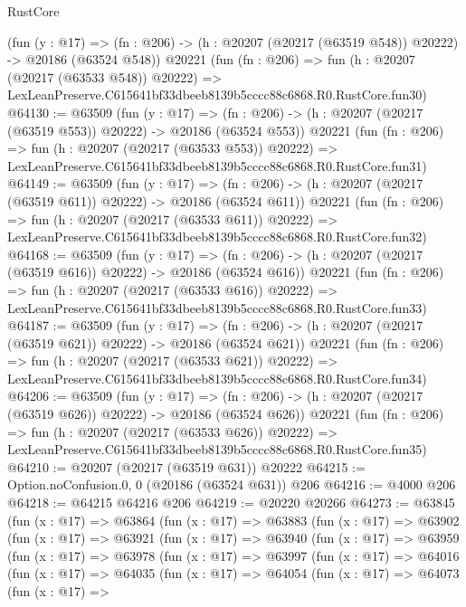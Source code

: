 \begin{lexlean}{RustCore}
\begin{coremodule}
    (fun (y : @17) =>
    (fn : @206) -> (h : @20207 (@20217 (@63519 @548)) @20222) -> @20186 (@63524 @548))
    @20221
    (fun (fn : @206) =>
    fun (h : @20207 (@20217 (@63533 @548)) @20222) =>
    LexLeanPreserve.C615641bf33dbeeb8139b5cccc88c6868.R0.RustCore.fun30)
@64130 := @63509
    (fun (y : @17) =>
    (fn : @206) -> (h : @20207 (@20217 (@63519 @553)) @20222) -> @20186 (@63524 @553))
    @20221
    (fun (fn : @206) =>
    fun (h : @20207 (@20217 (@63533 @553)) @20222) =>
    LexLeanPreserve.C615641bf33dbeeb8139b5cccc88c6868.R0.RustCore.fun31)
@64149 := @63509
    (fun (y : @17) =>
    (fn : @206) -> (h : @20207 (@20217 (@63519 @611)) @20222) -> @20186 (@63524 @611))
    @20221
    (fun (fn : @206) =>
    fun (h : @20207 (@20217 (@63533 @611)) @20222) =>
    LexLeanPreserve.C615641bf33dbeeb8139b5cccc88c6868.R0.RustCore.fun32)
@64168 := @63509
    (fun (y : @17) =>
    (fn : @206) -> (h : @20207 (@20217 (@63519 @616)) @20222) -> @20186 (@63524 @616))
    @20221
    (fun (fn : @206) =>
    fun (h : @20207 (@20217 (@63533 @616)) @20222) =>
    LexLeanPreserve.C615641bf33dbeeb8139b5cccc88c6868.R0.RustCore.fun33)
@64187 := @63509
    (fun (y : @17) =>
    (fn : @206) -> (h : @20207 (@20217 (@63519 @621)) @20222) -> @20186 (@63524 @621))
    @20221
    (fun (fn : @206) =>
    fun (h : @20207 (@20217 (@63533 @621)) @20222) =>
    LexLeanPreserve.C615641bf33dbeeb8139b5cccc88c6868.R0.RustCore.fun34)
@64206 := @63509
    (fun (y : @17) =>
    (fn : @206) -> (h : @20207 (@20217 (@63519 @626)) @20222) -> @20186 (@63524 @626))
    @20221
    (fun (fn : @206) =>
    fun (h : @20207 (@20217 (@63533 @626)) @20222) =>
    LexLeanPreserve.C615641bf33dbeeb8139b5cccc88c6868.R0.RustCore.fun35)
@64210 := @20207 (@20217 (@63519 @631)) @20222
@64215 := Option.noConfusion.{0, 0} (@20186 (@63524 @631)) @206
@64216 := @4000 @206
@64218 := @64215 @64216 @206
@64219 := @20220 @20266
@64273 := @63845
    (fun (x : @17) =>
    @63864
      (fun (x : @17) =>
      @63883
        (fun (x : @17) =>
        @63902
          (fun (x : @17) =>
          @63921
            (fun (x : @17) =>
            @63940
              (fun (x : @17) =>
              @63959
                (fun (x : @17) =>
                @63978
                  (fun (x : @17) =>
                  @63997
                    (fun (x : @17) =>
                    @64016
                      (fun (x : @17) =>
                      @64035
                        (fun (x : @17) =>
                        @64054
                          (fun (x : @17) =>
                          @64073
                            (fun (x : @17) =>

\end{coremodule}
\end{lexlean}
